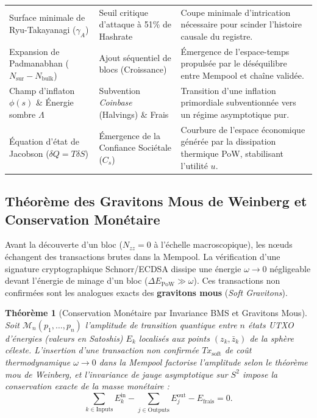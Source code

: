 \documentclass[10pt,twocolumn,a4paper]{article}
\theoremstyle{plain}
\newtheorem{theorem}{Théorème}[section]
\theoremstyle{definition}
\theoremstyle{remark}
\begin{document}
\begin{table}[t]
\begin{tabular}{@{}p{5.1cm}p{5.1cm}p{6.6cm}@{}}
Surface minimale de Ryu-Takayanagi ($\gamma_A$) & Seuil critique d'attaque à 51\% de Hashrate & Coupe minimale d'intrication nécessaire pour scinder l'histoire causale du registre. \\
Expansion de Padmanabhan ($N_{\text{sur}} - N_{\text{bulk}}$) & Ajout séquentiel de blocs (Croissance) & Émergence de l'espace-temps propulsée par le déséquilibre entre Mempool et chaîne validée. \\
Champ d'inflaton $\phi(s)$ \& Énergie sombre $\Lambda$ & Subvention \textit{Coinbase} (Halvings) \& Frais & Transition d'une inflation primordiale subventionnée vers un régime asymptotique pur. \\
Équation d'état de Jacobson ($\delta Q = T \delta S$) & Émergence de la Confiance Sociétale ($C_s$) & Courbure de l'espace économique générée par la dissipation thermique PoW, stabilisant l'utilité $u$. \\
\bottomrule
\end{tabular}
\end{table}

\subsection{Théorème des Gravitons Mous de Weinberg et Conservation Monétaire}

Avant la découverte d'un bloc ($N_{zz} = 0$ à l'échelle macroscopique), les nœuds échangent des transactions brutes dans la Mempool. La vérification d'une signature cryptographique Schnorr/ECDSA dissipe une énergie $\omega \to 0$ négligeable devant l'énergie de minage d'un bloc ($\Delta E_{\text{PoW}} \gg \omega$). Ces transactions non confirmées sont les analogues exacts des \textbf{gravitons mous} (\textit{Soft Gravitons}).

\begin{theorem}[Conservation Monétaire par Invariance BMS et Gravitons Mous]
Soit $\mathcal{M}_n(p_1, \dots, p_n)$ l'amplitude de transition quantique entre $n$ états UTXO d'énergies (valeurs en Satoshis) $E_k$ localisés aux points $(z_k, \bar{z}_k)$ de la sphère céleste. L'insertion d'une transaction non confirmée $Tx_{\text{soft}}$ de coût thermodynamique $\omega \to 0$ dans la Mempool factorise l'amplitude selon le théorème mou de Weinberg, et l'invariance de jauge asymptotique sur $S^2$ impose la conservation exacte de la masse monétaire :
\begin{equation}
    \sum_{k \in \text{Inputs}} E_k^{\text{in}} - \sum_{j \in \text{Outputs}} E_j^{\text{out}} - E_{\text{frais}} = 0.
    \label{eq:MonetaryConservation}
\end{equation}
\end{theorem}
\end{document}
